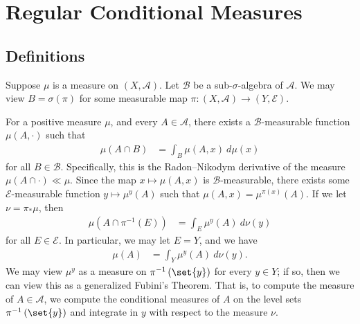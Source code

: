 \documentclass[10pt]{mypackage}
\begin{document}
\RaggedRight
\section{Regular Conditional Measures}%
\subsection{Definitions}%
Suppose $\mu$ is a measure on $\left( X,\mathcal{A} \right)$. Let $\mathcal{B}$ be a sub-$\sigma$-algebra of $ \mathcal{A} $. We may view $B = \sigma\left( \pi \right)$ for some measurable map $\pi\colon \left( X,\mathcal{A} \right)\to \left( Y,\mathcal{E} \right)$.

For a positive measure $\mu$, and every $A\in \mathcal{A}$, there exists a $\mathcal{B}$-measurable function $\mu\left( A,\cdot \right)$ such that
\begin{align*}
  \mu\left( A\cap B \right) &= \int_{B}^{} \mu\left( A,x \right)\:d\mu(x)
\end{align*}
for all $B\in \mathcal{B}$. Specifically, this is the Radon--Nikodym derivative of the measure $\mu\left( A\cap \cdot \right)\ll \mu$. Since the map $x\mapsto \mu\left( A,x \right)$ is $\mathcal{B}$-measurable, there exists some $ \mathcal{E} $-measurable function $y\mapsto \mu^y(A)$ such that $\mu\left( A,x \right) = \mu^{\pi(x)}\left( A \right)$. If we let $\nu = \pi_{\ast}\mu$, then
\begin{align*}
  \mu\left( A\cap \pi^{-1}\left( E \right) \right) &= \int_{E}^{} \mu^y(A)\:d\nu(y)
\end{align*}
for all $E\in \mathcal{E}$. In particular, we may let $E = Y$, and we have
\begin{align*}
  \mu(A) &= \int_{Y}^{} \mu^y(A)\:d\nu(y).
\end{align*}
We may view $\mu^y$ as a measure on $\pi^{-1}\left( \set{y} \right)$ for every $y\in Y$; if so, then we can view this as a generalized Fubini's Theorem. That is, to compute the measure of $A\in \mathcal{A}$, we compute the conditional measures of $A$ on the level sets $\pi^{-1}\left( \set{y} \right)$ and integrate in $y$ with respect to the measure $\nu$.
\end{document}
